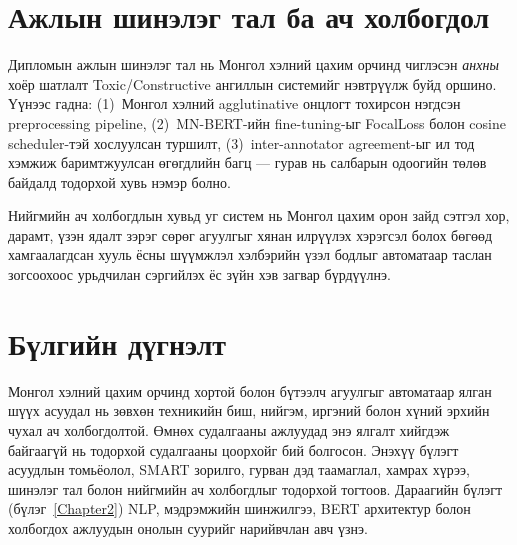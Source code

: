 \section{Ажлын шинэлэг тал ба ач холбогдол}

Дипломын ажлын шинэлэг тал нь Монгол хэлний цахим орчинд чиглэсэн \textit{анхны}
хоёр шатлалт Toxic/Constructive ангиллын системийг нэвтрүүлж буйд оршино.
Үүнээс гадна: (1)~Монгол хэлний agglutinative онцлогт тохирсон нэгдсэн
preprocessing pipeline, (2)~MN-BERT-ийн fine-tuning-ыг FocalLoss болон
cosine scheduler-тэй хослуулсан туршилт, (3)~inter-annotator agreement-ыг
ил тод хэмжиж баримтжуулсан өгөгдлийн багц --- гурав нь салбарын одоогийн
төлөв байдалд тодорхой хувь нэмэр болно.

Нийгмийн ач холбогдлын хувьд уг систем нь Монгол цахим орон зайд сэтгэл
хор, дарамт, үзэн ядалт зэрэг сөрөг агуулгыг хянан илрүүлэх хэрэгсэл болох
бөгөөд хамгаалагдсан хууль ёсны шүүмжлэл хэлбэрийн үзэл бодлыг автоматаар
таслан зогсоохоос урьдчилан сэргийлэх ёс зүйн хэв загвар бүрдүүлнэ.

\section{Бүлгийн дүгнэлт}

Монгол хэлний цахим орчинд хортой болон бүтээлч агуулгыг автоматаар ялган
шүүх асуудал нь зөвхөн техникийн биш, нийгэм, иргэний болон хүний эрхийн
чухал ач холбогдолтой. Өмнөх судалгааны ажлуудад энэ ялгалт хийгдэж
байгаагүй нь тодорхой судалгааны цоорхойг бий болгосон. Энэхүү бүлэгт
асуудлын томьёолол, SMART зорилго, гурван дэд таамаглал, хамрах хүрээ,
шинэлэг тал болон нийгмийн ач холбогдлыг тодорхой тогтоов. Дараагийн
бүлэгт (бүлэг~\ref{Chapter2}) NLP, мэдрэмжийн шинжилгээ, BERT архитектур
болон холбогдох ажлуудын онолын суурийг нарийвчлан авч үзнэ.
